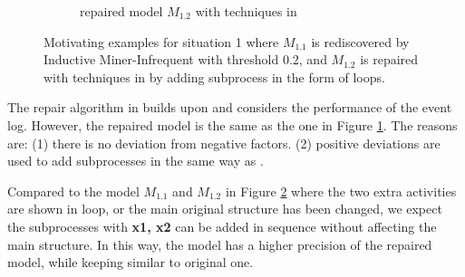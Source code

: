 \begin{figure}[htp]
\begin{subfigure}[b]{0.48\textwidth}
		\caption{repaired model $M_{1.2}$ with techniques in \cite{fahland2015model}}
		\label{fig:demo_s1_fahland}
	\end{subfigure}%
	\caption[Motivating examples for situation 1]{Motivating examples for situation 1 where $M_{1.1}$ is rediscovered by Inductive Miner-Infrequent with threshold 0.2, and $M_{1.2}$ is repaired with techniques in \cite{fahland2015model} by adding subprocess in the form of loops.}
	\label{fig:demo_s1}
\end{figure}

The repair algorithm in  \cite{dees2017enhancing} builds upon  \cite{fahland2015model} and considers the performance of the event log. However, the repaired model is the same as the one in Figure \ref{fig:demo_s1_fahland}. The reasons are: (1) there is no deviation from negative factors. (2) positive deviations are used to add subprocesses in the same way as  \cite{fahland2015model}. 


Compared to the model $M_{1.1}$ and $M_{1.2}$ in Figure \ref{fig:demo_s1} where the two extra activities are shown in loop, or the main original structure has been changed, we expect the subprocesses with \textbf{x1, x2} can be added in sequence without affecting the main structure. In this way, the model has a higher precision of the repaired model, while keeping similar to original one. %

